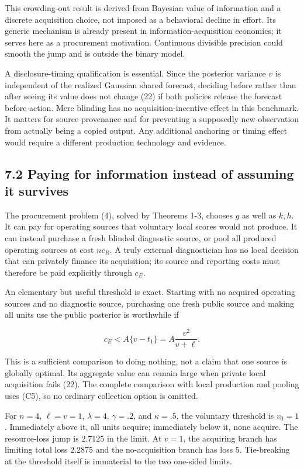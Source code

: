 \documentclass[
  11pt,
]{article}
\begin{document}
This crowding-out result is derived from Bayesian value of information
and a discrete acquisition choice, not imposed as a behavioral decline
in effort. Its generic mechanism is already present in
information-acquisition economics; it serves here as a procurement
motivation. Continuous divisible precision could smooth the jump and is
outside the binary model.

A disclosure-timing qualification is essential. Since the posterior
variance \(v\) is independent of the realized Gaussian shared forecast,
deciding before rather than after seeing its value does not change (22)
if both policies release the forecast before action. Mere blinding has
no acquisition-incentive effect in this benchmark. It matters for source
provenance and for preventing a supposedly new observation from actually
being a copied output. Any additional anchoring or timing effect would
require a different production technology and evidence.

\subsection{7.2 Paying for information instead of assuming it
survives}\label{paying-for-information-instead-of-assuming-it-survives}

The procurement problem (4), solved by Theorems 1-3, chooses \(g\) as
well as \(k,h\). It can pay for operating sources that voluntary local
scores would not produce. It can instead purchase a fresh blinded
diagnostic source, or pool all produced operating sources at cost
\(nc_R\). A truly external diagnostician has no local decision that can
privately finance its acquisition; its source and reporting costs must
therefore be paid explicitly through \(c_E\).

An elementary but useful threshold is exact. Starting with no acquired
operating sources and no diagnostic source, purchasing one fresh public
source and making all units use the public posterior is worthwhile if

\[c_E<A\{v-t_1\}=A\frac{v^2}{v+\ell}. \tag{25}\]

This is a sufficient comparison to doing nothing, not a claim that one
source is globally optimal. Its aggregate value can remain large when
private local acquisition fails (22). The complete comparison with local
production and pooling uses (C5), so no ordinary collection option is
omitted.

For \(n=4\), \(\ell=v=1\), \(\lambda=4\), \(\gamma=.2\), and
\(\kappa=.5\), the voluntary threshold is \(v_0=1\). Immediately above
it, all units acquire; immediately below it, none acquire. The
resource-loss jump is \(2.7125\) in the limit. At \(v=1\), the acquiring
branch has limiting total loss \(2.2875\) and the no-acquisition branch
has loss \(5\). Tie-breaking at the threshold itself is immaterial to
the two one-sided limits.
\end{document}
